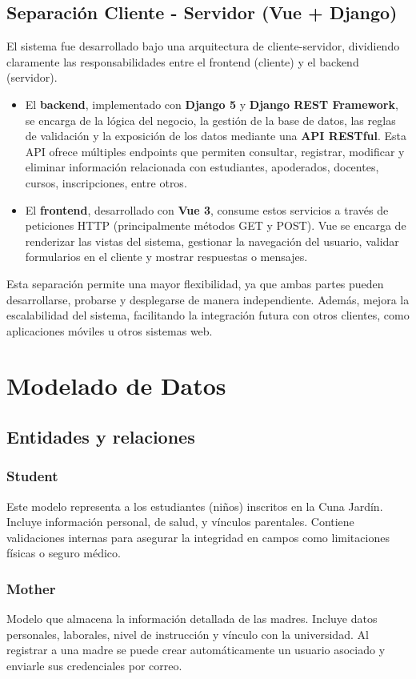 \documentclass{article}
\begin{document}
    \subsection{Separación Cliente - Servidor (Vue + Django)}
        El sistema fue desarrollado bajo una arquitectura de cliente-servidor, dividiendo claramente las responsabilidades entre el frontend (cliente) y el backend (servidor).
        \begin{itemize}
            \item El \textbf{backend}, implementado con \textbf{Django 5} y \textbf{Django REST Framework}, se encarga de la lógica del negocio, la gestión de la base de datos, las reglas de validación y la exposición de los datos mediante una \textbf{API RESTful}. Esta API ofrece múltiples endpoints que permiten consultar, registrar, modificar y eliminar información relacionada con estudiantes, apoderados, docentes, cursos, inscripciones, entre otros.
            \item El \textbf{frontend}, desarrollado con \textbf{Vue 3}, consume estos servicios a través de peticiones HTTP (principalmente métodos GET y POST). Vue se encarga de renderizar las vistas del sistema, gestionar la navegación del usuario, validar formularios en el cliente y mostrar respuestas o mensajes.
        \end{itemize}
        Esta separación permite una mayor flexibilidad, ya que ambas partes pueden desarrollarse, probarse y desplegarse de manera independiente. Además, mejora la escalabilidad del sistema, facilitando la integración futura con otros clientes, como aplicaciones móviles u otros sistemas web.

\section{Modelado de Datos}
    \subsection{Entidades y relaciones}
        \subsubsection{Student}
        Este modelo representa a los estudiantes (niños) inscritos en la Cuna Jardín. Incluye información personal, de salud, y vínculos parentales. Contiene validaciones internas para asegurar la integridad en campos como limitaciones físicas o seguro médico.

        \subsubsection{Mother}
        Modelo que almacena la información detallada de las madres. Incluye datos personales, laborales, nivel de instrucción y vínculo con la universidad. Al registrar a una madre se puede crear automáticamente un usuario asociado y enviarle sus credenciales por correo.
\end{document}
